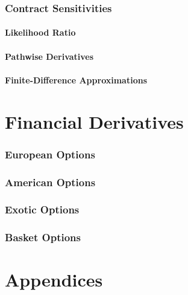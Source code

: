 \documentclass[12pt, a4paper]{article}
\begin{document}
\section{Contract Sensitivities}
%

\subsection{Likelihood Ratio}

\subsection{Pathwise Derivatives}


\subsection{Finite-Difference Approximations}
%

\part{Financial Derivatives}

\section{European Options}
%

\section{American Options}


\section{Exotic Options}
%

\section{Basket Options}
%

\clearpage
\printbibliography{}

\appendix

\clearpage
\thispagestyle{empty}
\part*{Appendices}
\markboth{}{}
\end{document}
